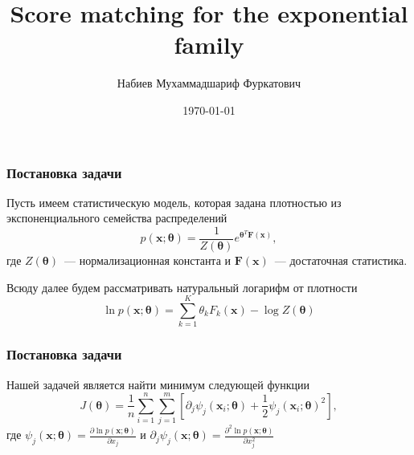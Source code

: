 \documentclass{beamer}
\title{Score matching for the exponential family}
\author{Набиев Мухаммадшариф Фуркатович}
\institute{Московский физико-технический институт}
\date{\today}
\begin{document}
\begin{frame}
    \titlepage
\end{frame}

\begin{frame}
    \frametitle{Постановка задачи}
    \par 
    \footnotemark Пусть имеем статистическую модель, которая задана плотностью из экспоненциального семейства распределений
    \begin{equation}
        p(\boldsymbol{x}; \boldsymbol{\theta}) = \frac{1}{Z(\boldsymbol{\theta})}e^{\boldsymbol{\theta}^T \boldsymbol{F} (\boldsymbol{x})}, 
    \end{equation}
    где $Z(\boldsymbol{\theta})$~--- нормализационная константа и $\boldsymbol{F} (\boldsymbol{x})$~--- достаточная статистика. 
    \par 
    Всюду далее будем рассматривать натуральный логарифм от плотности
    \begin{equation}
        \ln p(\boldsymbol{x}; \boldsymbol{\theta}) = \sum_{k=1}^K \theta_k F_k (\boldsymbol{x}) - \log Z(\boldsymbol{\theta})
    \end{equation}

    
\end{frame}


\begin{frame}
    \frametitle{Постановка задачи}
    Нашей задачей является найти минимум следующей функции
    \begin{equation}\label{objective-function}
        J(\boldsymbol{\theta}) = \frac{1}{n} \sum_{i=1}^n \sum_{j=1}^m \left[ \partial_j \psi_j (\boldsymbol{x}_i;\boldsymbol{\theta}) + \frac{1}{2} \psi_j (\boldsymbol{x}_i; \boldsymbol{\theta})^2 \right], 
    \end{equation}
    где $\psi_j(\boldsymbol{x}; \boldsymbol{\theta}) = \frac{\partial \ln p(\boldsymbol{x}; \boldsymbol{\theta})}{\partial x_j}$ и $\partial_j \psi_j (\boldsymbol{x};\boldsymbol{\theta}) = \frac{\partial^2 \ln p(\boldsymbol{x}; \boldsymbol{\theta})}{\partial x_j^2}$
\end{frame}
\end{document}
